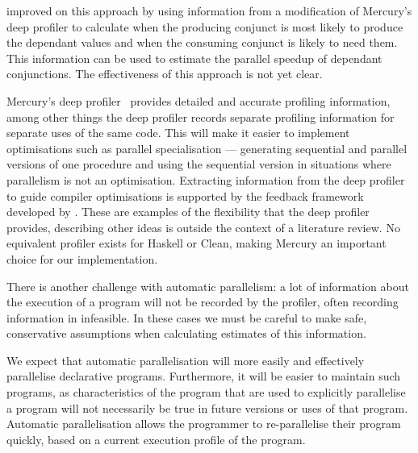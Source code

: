 \citet{bone:2008:hons} improved on this approach by using
information from a modification of Mercury's deep profiler to
calculate when the producing conjunct is most likely to produce the
dependant values and when the consuming conjunct is likely to need
them.
This information can be used to estimate the parallel speedup of
dependant conjunctions.
The effectiveness of this approach is not yet clear.

Mercury's deep profiler~\citep{conway:2001:mercury-deep} provides
detailed and accurate profiling information,
among other things the deep profiler records separate profiling
information for separate uses of the same code.
This will make it easier to implement optimisations such as
parallel specialisation --- generating sequential and parallel
versions of one procedure and using the sequential version
in situations where parallelism is not an optimisation.
Extracting information from the deep profiler to guide compiler
optimisations is supported by the feedback framework developed by
\citet{bone:2008:hons}.
These are examples of the flexibility that the deep profiler provides,
describing other ideas is outside the context of a literature review.
No equivalent profiler exists for Haskell or Clean, making Mercury an
important choice for our implementation.

There is another challenge with automatic parallelism: a lot of
information about the execution of a program will not be recorded by the
profiler, often recording information in infeasible.
In these cases we must be careful to make safe, conservative
assumptions when calculating estimates of this information.



We expect that automatic parallelisation will more easily and
effectively parallelise declarative programs.
Furthermore, it will be easier to maintain such programs, as
characteristics of the program that are used to explicitly parallelise
a program will not necessarily be true in future versions or uses of that
program.
Automatic parallelisation allows the programmer to re-parallelise
their program quickly, based on a current execution profile of the
program.

